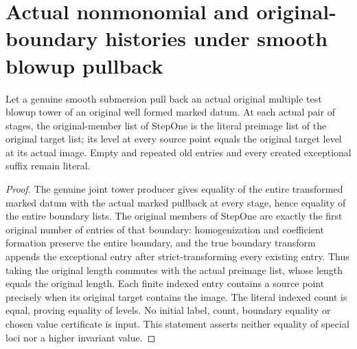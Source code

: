 \section{Actual nonmonomial and original-boundary histories under smooth blowup pullback}

\begin{theorem}
\label{hir:submersion-history-original-members}
\leanok
Let a genuine smooth submersion pull back an actual original multiple test
blowup tower of an original well formed marked datum. At each actual pair
of stages, the original-member list of StepOne is the literal preimage list
of the original target list; its level at every source point equals the
original target level at its actual image. Empty and repeated old entries
and every created exceptional suffix remain literal.
\end{theorem}
\begin{proof}
The genuine joint tower producer gives equality of the entire transformed
marked datum with the actual marked pullback at every stage, hence equality
of the entire boundary lists. The original members of StepOne are exactly
the first original number of entries of that boundary: homogenization and
coefficient formation preserve the entire boundary, and the true boundary
transform appends the exceptional entry after strict-transforming every
existing entry. Thus taking the original length commutes with the actual
preimage list, whose length equals the original length. Each finite indexed
entry contains a source point precisely when its original target contains
the image. The literal indexed count is equal, proving equality of levels.
No initial label, count, boundary equality or chosen value certificate is
input. This statement asserts neither equality of special loci nor a
higher invariant value.
\end{proof}

